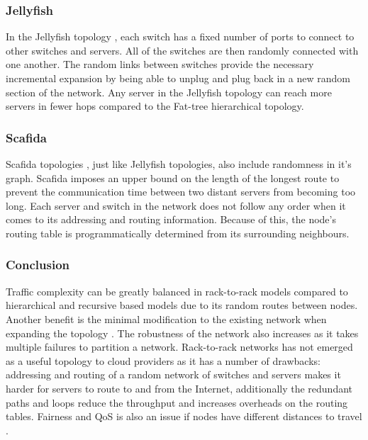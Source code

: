 \documentclass[12pt]{article}
\begin{document}
\subsubsection{Jellyfish} \label{subp:jellyfish}

In the Jellyfish topology \cite{singla2012jellyfish}, each switch has a fixed number of ports to connect to other switches and servers. All of the switches are then randomly connected with one another. The random links between switches provide the necessary incremental expansion by being able to unplug and plug back in a new random section of the network. Any server in the Jellyfish topology can reach more servers in fewer hops compared to the Fat-tree hierarchical topology.


\subsubsection{Scafida} \label{subp:scafida}

Scafida topologies \cite{gyarmati2010scafida}, just like Jellyfish topologies, also include randomness in it's graph. Scafida imposes an upper bound on the length of the longest route to prevent the communication time between two distant servers from becoming too long. Each server and switch in the network does not follow any order when it comes to its addressing and routing information. Because of this, the node's routing table is programmatically determined from its surrounding neighbours.



\subsubsection{Conclusion} \label{ssub:rack-concl}


Traffic complexity can be greatly balanced in rack-to-rack models compared to hierarchical and recursive based models due to its random routes between nodes. Another benefit is the minimal modification to the existing network when expanding the topology \cite{xia2016survey}. The robustness of the network also increases as it takes multiple failures to partition a network. Rack-to-rack networks has not emerged as a useful topology to cloud providers as it has a number of drawbacks: addressing and routing of a random network of switches and servers makes it harder for servers to route to and from the Internet, additionally the redundant paths and loops reduce the throughput and increases overheads on the routing tables. Fairness and QoS is also an issue if nodes have different distances to travel \cite{wang2015survey}.
\end{document}
